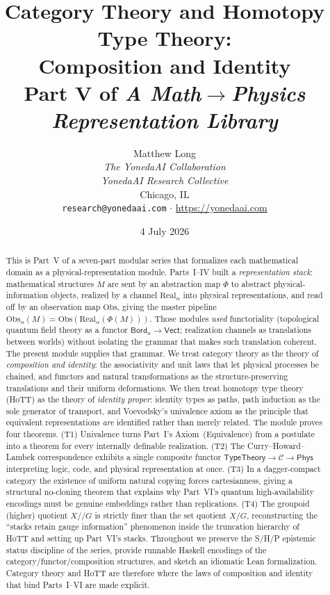 \documentclass[12pt]{article}
\title{\textbf{Category Theory and Homotopy Type Theory:\\ Composition and Identity}\\[0.6em]
\large Part V of \emph{A Math$\to$Physics Representation Library}}
\author{Matthew Long \\
\textit{The YonedaAI Collaboration} \\
\textit{YonedaAI Research Collective} \\
Chicago, IL \\
\texttt{research@yonedaai.com} $\cdot$ \url{https://yonedaai.com}}
\date{4 July 2026}
\theoremstyle{definition}
\theoremstyle{remark}
\newcommand{\Phys}{\mathsf{Phys}}
\newcommand{\Vect}{\mathsf{Vect}}
\newcommand{\Bord}{\mathsf{Bord}}
\newcommand{\Real}{\mathrm{Real}}
\newcommand{\Obs}{\mathrm{Obs}}
\begin{document}
\maketitle

\begin{abstract}
This is Part~V of a seven-part modular series that formalizes each mathematical
domain as a physical-representation module. Parts~I--IV built a
\emph{representation stack}: mathematical structures $M$ are sent by an
abstraction map $\Phi$ to abstract physical-information objects, realized by a
channel $\Real_\alpha$ into physical representations, and read off by an
observation map $\Obs$, giving the master pipeline
$\Obs_\alpha(M)=\Obs(\Real_\alpha(\Phi(M)))$. Those modules \emph{used}
functoriality (topological quantum field theory as a functor
$\Bord_n\to\Vect$; realization channels as translations between worlds) without
isolating the grammar that makes such translation coherent. The present module
supplies that grammar. We treat category theory as the theory of
\emph{composition and identity}: the associativity and unit laws that let
physical processes be chained, and functors and natural transformations as the
structure-preserving translations and their uniform deformations. We then treat
homotopy type theory (HoTT) as the theory of \emph{identity proper}: identity
types as paths, path induction as the sole generator of transport, and
Voevodsky's univalence axiom as the principle that equivalent representations
\emph{are} identified rather than merely related. The module proves four theorems. (T1) Univalence turns Part~I's Axiom~(Equivalence) from a postulate into
a theorem for every internally definable realization. (T2) The
Curry--Howard--Lambek correspondence exhibits a single composite functor
$\mathsf{TypeTheory}\to\mathcal{C}\to\Phys$ interpreting logic, code, and
physical representation at once. (T3) In a dagger-compact category the existence
of uniform natural copying forces cartesianness, giving a structural no-cloning
theorem that explains why Part~VI's quantum high-availability encodings must be
genuine embeddings rather than replications. (T4) The groupoid (higher) quotient
$X/\!/G$ is strictly finer than the set quotient $X/G$, reconstructing the
``stacks retain gauge information'' phenomenon inside the truncation hierarchy of
HoTT and setting up Part~VI's stacks. Throughout we preserve the S/H/P epistemic
status discipline of the series, provide runnable Haskell encodings of the
category/functor/composition structures, and sketch an idiomatic Lean
formalization. Category theory and HoTT are therefore where the laws of composition and
identity that bind Parts~I--VI are made explicit.
\end{abstract}
\end{document}
